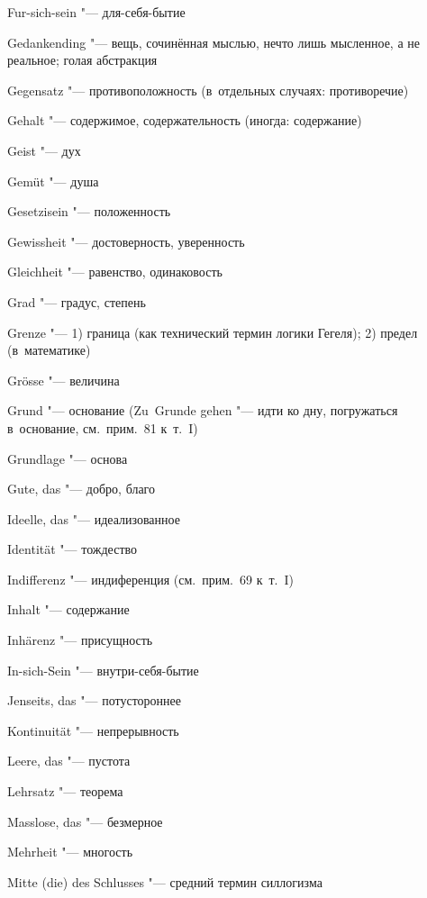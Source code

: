 \begin{multicols}{2}
Fur-sich-sein "--- для-себя-бытие

\bigskip

Gedank\-ending "--- вещь, сочинённая мыслью, нечто лишь мысленное,
а не реальное; голая абстракция

Gegen\-satz "--- противоположность (в~отдельных случаях:
противоречие)

Gehalt "--- содержимое, содержательность (иногда: содержание)

Geist "--- дух

Gemüt "--- душа

Gesetzi\-sein "--- положенность

Gewiss\-heit "--- достоверность, уверенность

Gleich\-heit "--- равенство, одинаковость

Grad "--- градус, степень

Grenze "--- 1) граница (как технический термин логики Гегеля); 2) предел
(в~математике)

Grösse "--- величина

Grund "--- основание (Zu~Grunde gehen "--- идти ко дну,
погружаться в~основание, см.~прим.~81 к~т.~I)

Grundlage "--- основа

Gute, das "--- добро, благо

\bigskip

Ideelle, das "--- идеализованное

Identität "--- тождество

Indiffe\-renz "--- индиференция (см.~прим.~69 к~т.~I)

Inhalt "--- содержание

Inhärenz "--- присущность

In-sich-Sein "--- внутри-себя-бытие

\bigskip

Jenseits, das "--- потустороннее

\bigskip

Kontinui\-tät "--- непрерывность

\bigskip

Leere, das "--- пустота

Lehrsatz "--- теорема

\bigskip

Masslose, das "--- безмерное

Mehrheit "--- многость

Mitte (die) des Schlusses "--- средний термин силлогизма

\bigskip


\end{multicols}

